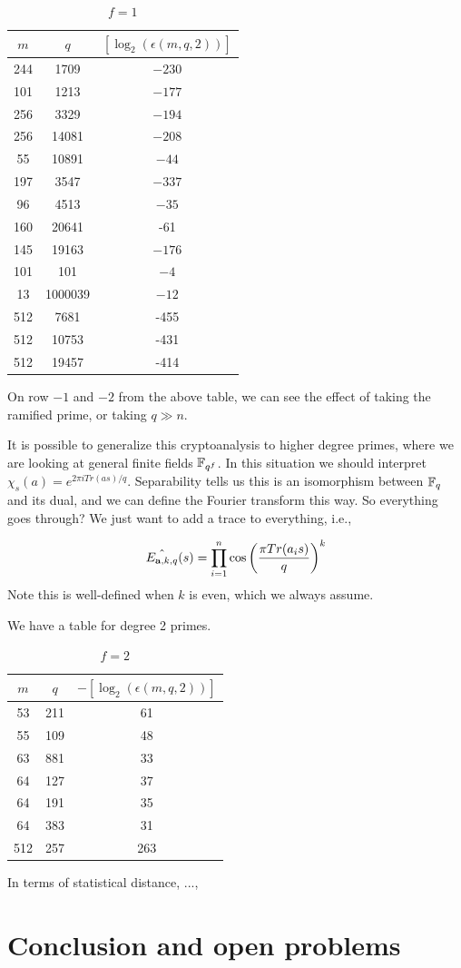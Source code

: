 \documentclass{amsart}
\begin{document}
\FloatBarrier
\begin{table}[H]
\caption{$f = 1$}
\begin{tabular}{c|c|c}
$m$ & $q$ & $[\log_2(\epsilon(m,q, 2))]$ \\
\hline
244 & 1709 & $-230$ \\
101 & 1213 & $-177$ \\
256 & 3329 & $-194$ \\
256 & 14081 & $-208$ \\
55 & 10891  & $-44$ \\
197 & 3547 & $-337$ \\
96 & 4513 & $-35$ \\
160 & 20641 & -61 \\
145 & 19163 & $-176$ \\
101 & 101 & $-4$ \\
13 & 1000039 & $-12$ \\
512 & 7681 & -455  \\
512 & 10753 & -431 \\
512 & 19457 & -414
\end{tabular}
\end{table}

On row $-1$ and $-2$ from the above table, we can see the effect of taking the ramified prime, or taking $q \gg n$.



\begin{remark}
It is possible to generalize this cryptoanalysis to higher degree primes, where we are looking at general finite fields $\mathbb{F}_{q^f}$. In this situation we should interpret
$\chi_s(a) = e^{2 \pi i Tr(as)/q}$. Separability tells us this is an isomorphism between $\mathbb{F}_q$ and its dual, and we can define the Fourier transform this way. So everything goes through? We just want to add a trace to everything, i.e.,

\[
    \hat{E_{{\bf a}, k, q}}(s) = \prod_{i=1}^{n} \cos \left(\frac{ \pi Tr(a_i s) }{q} \right)^k
\]
Note this is well-defined when $k$ is even, which we always assume.
\end{remark}


We have a table for degree 2 primes.
\FloatBarrier
\begin{table}[H]
\caption{$f = 2$}
\begin{tabular}{c|c|c}
$m$ & $q$ & $-[\log_2(\epsilon(m,q,2))]$ \\
\hline
53 & 211 & 61 \\
55 & 109 & 48 \\
63 & 881 & 33 \\
64 & 127 & 37 \\
64 & 191 & 35 \\
64 & 383 & 31 \\
512 & 257 & 263
\end{tabular}
\end{table}

In terms of statistical distance, ...,

\section{Conclusion and open problems}



\end{document}
